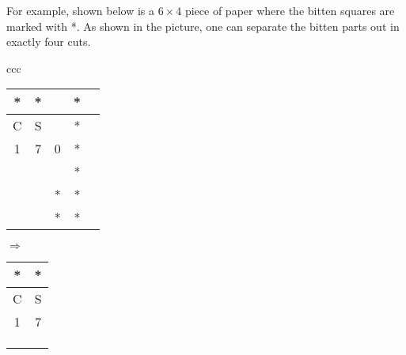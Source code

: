 \documentclass[11pt]{article}
\begin{document}
For example, shown below is a $6 \times 4$ piece of paper where the bitten squares are marked with *.  As shown in the picture, one can separate the bitten parts out in
exactly four  cuts. \\

\begin{tabular}{ccc}
%
\begin{tabular}{|c|c|c|c|c|}
\hline
*  & * &  & *   \\ \hline
C  & S &  & *   \\ \hline
1 &7  & 0 &  *  \\ \hline
  &  &  & *   \\ \hline
  &  & * & *   \\ \hline
  &  & * & *   \\ \hline
\end{tabular}
%
 $\Longrightarrow$
%
\begin{tabular}{|c|c|}
\hline
 * &  *     \\ \hline
 C & S     \\ \hline
1 & 7    \\ \hline
  &      \\ \hline
  &     \\ \hline
  &      \\ \hline
\end{tabular}


\end{tabular}
\end{document}
